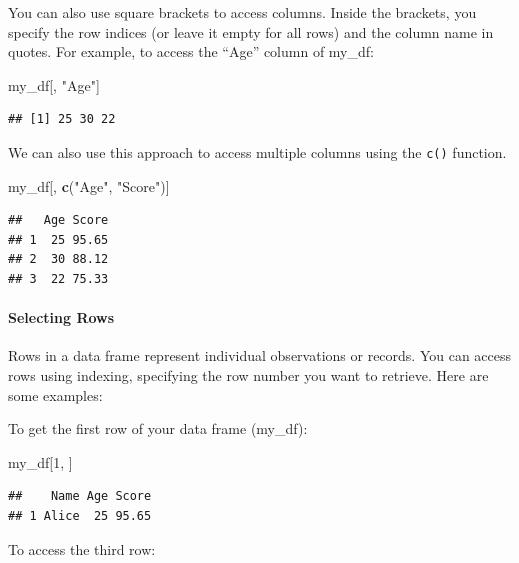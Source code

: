 \documentclass[
]{book}
\newenvironment{Shaded}{\begin{snugshade}}{\end{snugshade}}
\newcommand{\DecValTok}[1]{\textcolor[rgb]{0.00,0.00,0.81}{#1}}
\newcommand{\FunctionTok}[1]{\textcolor[rgb]{0.13,0.29,0.53}{\textbf{#1}}}
\newcommand{\NormalTok}[1]{#1}
\newcommand{\StringTok}[1]{\textcolor[rgb]{0.31,0.60,0.02}{#1}}
\begin{document}
You can also use square brackets to access columns. Inside the brackets, you specify the row indices (or leave it empty for all rows) and the column name in quotes. For example, to access the ``Age'' column of my\_df:

\begin{Shaded}
\begin{Highlighting}[]
\NormalTok{my\_df[, }\StringTok{"Age"}\NormalTok{]}
\end{Highlighting}
\end{Shaded}

\begin{verbatim}
## [1] 25 30 22
\end{verbatim}

We can also use this approach to access multiple columns using the \texttt{c()} function.

\begin{Shaded}
\begin{Highlighting}[]
\NormalTok{my\_df[, }\FunctionTok{c}\NormalTok{(}\StringTok{"Age"}\NormalTok{, }\StringTok{"Score"}\NormalTok{)]}
\end{Highlighting}
\end{Shaded}

\begin{verbatim}
##   Age Score
## 1  25 95.65
## 2  30 88.12
## 3  22 75.33
\end{verbatim}

\hypertarget{selecting-rows}{%
\paragraph{Selecting Rows}\label{selecting-rows}}

Rows in a data frame represent individual observations or records. You can access rows using indexing, specifying the row number you want to retrieve. Here are some examples:

To get the first row of your data frame (my\_df):

\begin{Shaded}
\begin{Highlighting}[]
\NormalTok{my\_df[}\DecValTok{1}\NormalTok{, ]}
\end{Highlighting}
\end{Shaded}

\begin{verbatim}
##    Name Age Score
## 1 Alice  25 95.65
\end{verbatim}

To access the third row:
\end{document}
